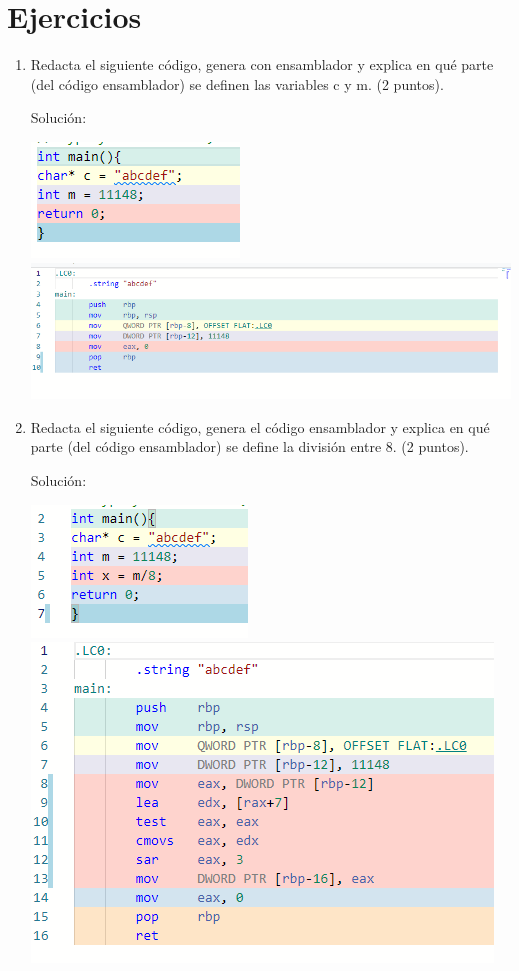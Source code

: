 \documentclass{article}
\begin{document}
	\section{Ejercicios}\label{sec:ejercicios}
	\begin{enumerate}
		\item Redacta el siguiente código, genera con ensamblador y explica en qué parte (del código ensamblador) se definen las variables c y m. (2 puntos).
		
		Solución: \\
		\begin{center}
		    \includegraphics[width=.3\textwidth]{Imagenes/ejercicio 1.1.png}
		    \includegraphics[width=.9\textwidth]{Imagenes/ejercicio 1.png}
		\end{center}\newpage
		\item Redacta el siguiente código, genera el código ensamblador y explica en qué parte (del código ensamblador) se define la división entre 8. (2 puntos).
		
		Solución: \\
        \begin{center}
		    \includegraphics[width=.6\textwidth]{Imagenes/ejercicio 2.png}
		    \includegraphics[width=.9\textwidth]{Imagenes/ejercicio 2.1.png}
		\end{center}\newpage


\end{enumerate}
\end{document}

